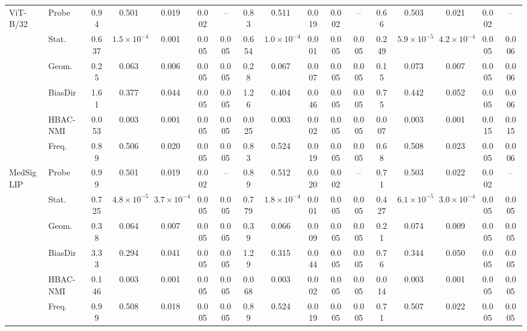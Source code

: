 \begin{tabular}{llccccccccccccccc}
\midrule
ViT-B/32 & Probe & 0.94 & 0.501 & 0.019 & 0.002 & -- & 0.83 & 0.511 & 0.019 & 0.002 & -- & 0.66 & 0.503 & 0.021 & 0.002 & -- \\
 & Stat. & 0.637 & $1.5{\times}10^{-4}$ & 0.001 & 0.005 & 0.005 & 0.654 & $1.0{\times}10^{-4}$ & 0.001 & 0.005 & 0.005 & 0.249 & $5.9{\times}10^{-5}$ & $4.2{\times}10^{-4}$ & 0.005 & 0.006 \\
 & Geom. & 0.25 & 0.063 & 0.006 & 0.005 & 0.005 & 0.28 & 0.067 & 0.007 & 0.005 & 0.005 & 0.15 & 0.073 & 0.007 & 0.005 & 0.006 \\
 & BiasDir & 1.61 & 0.377 & 0.044 & 0.005 & 0.005 & 1.26 & 0.404 & 0.046 & 0.005 & 0.005 & 0.75 & 0.442 & 0.052 & 0.005 & 0.006 \\
 & HBAC-NMI & 0.053 & 0.003 & 0.001 & 0.005 & 0.005 & 0.025 & 0.003 & 0.002 & 0.005 & 0.005 & 0.007 & 0.003 & 0.001 & 0.015 & 0.015 \\
 & Freq. & 0.89 & 0.506 & 0.020 & 0.005 & 0.005 & 0.83 & 0.524 & 0.019 & 0.005 & 0.005 & 0.68 & 0.508 & 0.023 & 0.005 & 0.006 \\
\midrule
MedSigLIP & Probe & 0.99 & 0.501 & 0.019 & 0.002 & -- & 0.89 & 0.512 & 0.020 & 0.002 & -- & 0.71 & 0.503 & 0.022 & 0.002 & -- \\
 & Stat. & 0.725 & $4.8{\times}10^{-5}$ & $3.7{\times}10^{-4}$ & 0.005 & 0.005 & 0.779 & $1.8{\times}10^{-4}$ & 0.001 & 0.005 & 0.005 & 0.427 & $6.1{\times}10^{-5}$ & $3.0{\times}10^{-4}$ & 0.005 & 0.005 \\
 & Geom. & 0.38 & 0.064 & 0.007 & 0.005 & 0.005 & 0.39 & 0.066 & 0.009 & 0.005 & 0.005 & 0.21 & 0.074 & 0.009 & 0.005 & 0.005 \\
 & BiasDir & 3.33 & 0.294 & 0.041 & 0.005 & 0.005 & 1.29 & 0.315 & 0.044 & 0.005 & 0.005 & 0.76 & 0.344 & 0.050 & 0.005 & 0.005 \\
 & HBAC-NMI & 0.146 & 0.003 & 0.001 & 0.005 & 0.005 & 0.068 & 0.003 & 0.002 & 0.005 & 0.005 & 0.014 & 0.003 & 0.001 & 0.005 & 0.005 \\
 & Freq. & 0.99 & 0.508 & 0.018 & 0.005 & 0.005 & 0.89 & 0.524 & 0.019 & 0.005 & 0.005 & 0.71 & 0.507 & 0.022 & 0.005 & 0.005 \\
\bottomrule
\end{tabular}
